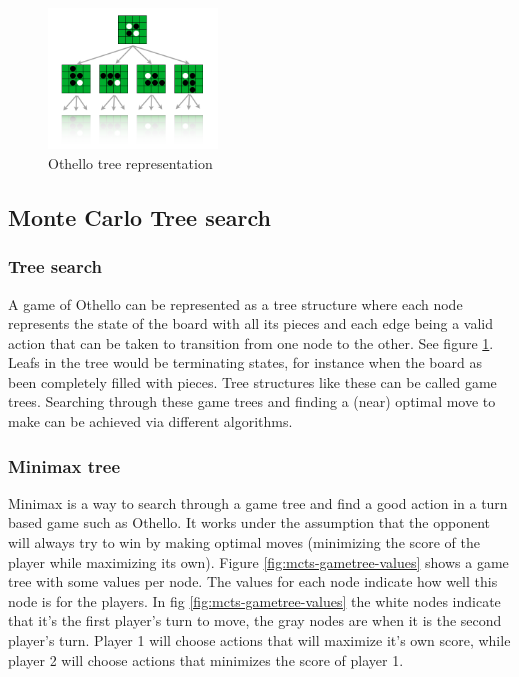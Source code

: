 \documentclass[10pt,letterpaper]{article}
\begin{document}
\begin{figure}
    \centering
    \includegraphics[width=0.4\textwidth]{images/othello-gametree}
    \caption{Othello tree representation}
    \label{fig:othello-gametree}
\end{figure}
\subsection{Monte Carlo Tree search}
\subsubsection{Tree search}
A game of Othello can be represented as a tree structure where each node represents the state of the board with all its pieces and each edge being a valid action that can be taken to transition from one node to the other. See figure \ref{fig:othello-gametree}. Leafs in the tree would be terminating states, for instance when the board as been completely filled with pieces. Tree structures like these can be called game trees. Searching through these game trees and finding a (near) optimal move to make can be achieved via different algorithms.

\subsubsection{Minimax tree}
Minimax is a way to search through a game tree and find a good action in a turn based game such as Othello. It works under the assumption that the opponent will always try to win by making optimal moves (minimizing the score of the player while maximizing its own). Figure \ref{fig:mcts-gametree-values} shows a game tree with some values per node. The values for each node indicate how well this node is for the players. In fig \ref{fig:mcts-gametree-values} the white nodes indicate that it's the first player's turn to move, the gray nodes are when it is the second player's turn. Player 1 will choose actions that will maximize it's own score, while player 2 will choose actions that minimizes the score of player 1.
\end{document}
